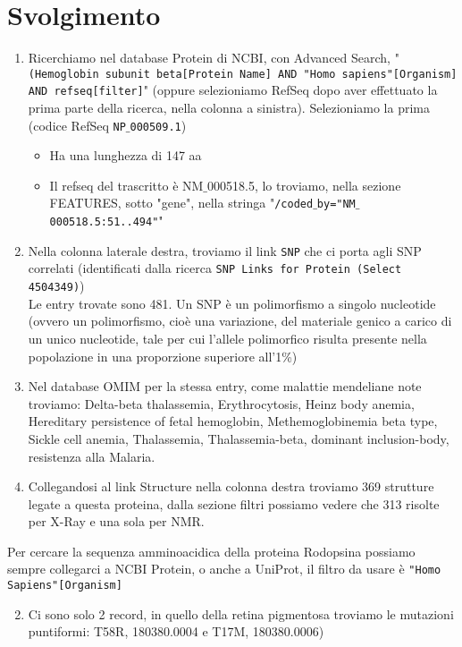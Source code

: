 \documentclass{article}
\begin{document}
\section*{Svolgimento}
\begin{enumerate}
   \item Ricerchiamo nel database Protein di NCBI, con Advanced Search, "\texttt{(Hemoglobin subunit beta[Protein Name]  AND "Homo sapiens"[Organism] AND refseq[filter]}" (oppure selezioniamo RefSeq dopo aver effettuato la prima parte della ricerca, nella colonna a sinistra). Selezioniamo la prima (codice RefSeq \texttt{NP$\_$000509.1})
   \begin{itemize}
      \item Ha una lunghezza di 147 aa 
      \item Il refseq del trascritto è NM$\_$000518.5, lo troviamo, nella sezione FEATURES, sotto "gene", nella stringa "\texttt{/coded$\_$by="NM$\_$000518.5:51..494"}"
   \end{itemize} 
   \setcounter{enumi}{3}
   \item Nella colonna laterale destra, troviamo il link \texttt{SNP} che ci porta agli SNP correlati (identificati dalla ricerca \texttt{SNP Links for Protein (Select 4504349)})\\ Le entry trovate sono 481. Un SNP è un polimorfismo a singolo nucleotide (ovvero  un polimorfismo, cioè una variazione, del materiale genico a carico di un unico nucleotide, tale per cui l'allele polimorfico risulta presente nella popolazione in una proporzione superiore all'1\%)
   \item Nel database OMIM per la stessa entry, come malattie mendeliane note troviamo: Delta-beta thalassemia, Erythrocytosis, Heinz body anemia, Hereditary persistence of fetal hemoglobin, Methemoglobinemia beta type, Sickle cell anemia, Thalassemia, Thalassemia-beta, dominant inclusion-body, resistenza alla Malaria.
   \item Collegandosi al link Structure nella colonna destra troviamo 369 strutture legate a questa proteina, dalla sezione filtri possiamo vedere che 313 risolte per X-Ray e una sola per NMR. 
\end{enumerate}
Per cercare la sequenza amminoacidica della proteina Rodopsina possiamo sempre collegarci a NCBI Protein, o anche a UniProt, il filtro da usare è \texttt{"Homo Sapiens"[Organism]}
\begin{enumerate}
   \setcounter{enumi}{1}
   \item Ci sono solo 2 record,  in quello della retina pigmentosa troviamo le mutazioni puntiformi: T58R, 180380.0004 e  T17M, 180380.0006)
\end{enumerate}
\end{document}
